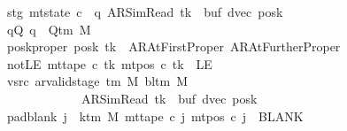 \begin{isabellebody}
\ \ \ \ \ \ \ stg{\isacharcolon}{\kern0pt}\ {\isachardoublequoteopen}mt{\isacharunderscore}{\kern0pt}state\ c{\isacharprime}{\kern0pt}\ {\isacharequal}{\kern0pt}\ {\isacharparenleft}{\kern0pt}q{\isacharcomma}{\kern0pt}\ AR{\isacharunderscore}{\kern0pt}SimRead{\isacharcomma}{\kern0pt}\ tk{\isacharcomma}{\kern0pt}\ {}{\isacharcomma}{\kern0pt}\ buf{\isacharcomma}{\kern0pt}\ dvec{\isacharcomma}{\kern0pt}\ posk{\isacharparenright}{\kern0pt}{\isachardoublequoteclose}\isanewline
\ \ \ \ \ \ \ qQ{\isacharcolon}{\kern0pt}\ {\isachardoublequoteopen}q\ {\isasymin}\ Q{\isacharunderscore}{\kern0pt}tm\ M{\isachardoublequoteclose}\isanewline
\ \ \ \ \ \ \ posk{\isacharunderscore}{\kern0pt}proper{\isacharcolon}{\kern0pt}\ {\isachardoublequoteopen}posk\ tk\ {\isasymin}\ {\isacharbraceleft}{\kern0pt}AR{\isacharunderscore}{\kern0pt}AtFirstProper{\isacharcomma}{\kern0pt}\ AR{\isacharunderscore}{\kern0pt}AtFurtherProper{\isacharbraceright}{\kern0pt}{\isachardoublequoteclose}\isanewline
\ \ \ \ \ \ \ notLE{\isacharcolon}{\kern0pt}\ {\isachardoublequoteopen}mt{\isacharunderscore}{\kern0pt}tape\ c{\isacharprime}{\kern0pt}\ tk\ {\isacharparenleft}{\kern0pt}mt{\isacharunderscore}{\kern0pt}pos\ c{\isacharprime}{\kern0pt}\ tk{\isacharparenright}{\kern0pt}\ {\isasymnoteq}\ LE{}{\isachardoublequoteclose}\isanewline
\ \ \ \ \ \ \ vsrc{\isacharcolon}{\kern0pt}\ {\isachardoublequoteopen}ar{\isacharunderscore}{\kern0pt}valid{\isacharunderscore}{\kern0pt}stage\ {\isacharparenleft}{\kern0pt}{\isasymGamma}{\isacharunderscore}{\kern0pt}tm\ M{\isacharparenright}{\kern0pt}\ {\isacharparenleft}{\kern0pt}bl{\isacharunderscore}{\kern0pt}tm\ M{\isacharparenright}{\kern0pt}\isanewline
\ \ \ \ \ \ \ \ \ \ \ \ \ \ \ \ \ \ \ {\isacharparenleft}{\kern0pt}AR{\isacharunderscore}{\kern0pt}SimRead{\isacharcomma}{\kern0pt}\ tk{\isacharcomma}{\kern0pt}\ {}{\isacharcomma}{\kern0pt}\ buf{\isacharcomma}{\kern0pt}\ dvec{\isacharcomma}{\kern0pt}\ posk{\isacharparenright}{\kern0pt}{\isachardoublequoteclose}\isanewline
\ \ \ \ \ \ \ pad{\isacharunderscore}{\kern0pt}blank{\isacharcolon}{\kern0pt}\ {\isachardoublequoteopen}{\isasymforall}j\ {\isasymge}\ k{\isacharunderscore}{\kern0pt}tm\ M{\isachardot}{\kern0pt}\ mt{\isacharunderscore}{\kern0pt}tape\ c{\isacharprime}{\kern0pt}\ j\ {\isacharparenleft}{\kern0pt}mt{\isacharunderscore}{\kern0pt}pos\ c{\isacharprime}{\kern0pt}\ j{\isacharparenright}{\kern0pt}\ {\isacharequal}{\kern0pt}\ BLANK{}{\isachardoublequoteclose}\isanewline

\end{isabellebody}
